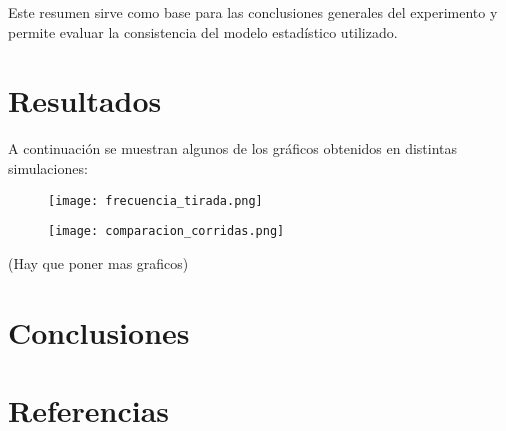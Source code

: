 \documentclass{article}
\begin{document}
Este resumen sirve como base para las conclusiones generales del experimento y permite evaluar la consistencia del modelo estadístico utilizado.


\section{Resultados}

A continuación se muestran algunos de los gráficos obtenidos en distintas simulaciones:

\begin{figure}[H]
    \centering
    \texttt{[image: frecuencia\_tirada.png]}
    \caption{}
\end{figure}

\begin{figure}[H]
    \centering
    \texttt{[image: comparacion\_corridas.png]}
    \caption{}
\end{figure}

(Hay que poner mas graficos)

\section{Conclusiones}



\section*{Referencias}

\begin{itemize}

\end{itemize}
\end{document}
